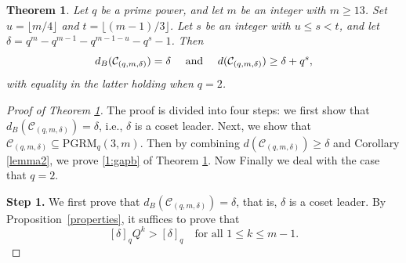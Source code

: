 \documentclass[10pt,a4paper]{amsart}
\newtheorem{theorem}{Theorem}
\begin{document}
\begin{theorem}\label{mainth}
Let $q$ be a prime power, and let  $m$ be an integer with $m\ge 13$.  Set $u=\lfloor m/4\rfloor$ and
$t=\lfloor (m-1)/3\rfloor$. Let $s$ be an integer with $u\le s<t$, and let
$\delta=q^m-q^{m-1}-q^{m-1-u}-q^{s}-1$. Then
\begin{equation} \label{1:gapb}
d_B(\mathcal{C}_{(q,m,\delta)})=\delta\quad \hbox{ and }\quad 
  d(\mathcal{C}_{(q,m,\delta)}) \geq \delta+q^{s}, 
\end{equation}
with equality in the latter holding when $q = 2$.
\end{theorem} 

\begin{proof}[Proof of Theorem \ref{mainth}]
The proof is divided into four steps: we first show that $d_B(\mathcal{C}_{(q,m,\delta)})=\delta$, i.e., $\delta$ is a coset leader. Next, we show that $\mathcal{C}_{(q,m,\delta)} \subseteq
\mathrm{PGRM}_q(3,m)$. Then by combining $d(\mathcal{C}_{(q,m,\delta)}) \ge \delta$ and Corollary \ref{lemma2}, we prove \eqref{1:gapb} of Theorem \ref{mainth}. Now Finally we deal with the case that $q=2$. 

{\bf Step 1.} We first prove that $d_B(\mathcal{C}_{(q,m,\delta)})=\delta$, that is, $\delta$ is a coset leader.  
By Proposition~\ref{properties}, it suffices to prove that
\begin{equation}\label{suf}
[\delta]_qQ^k>[\delta]_q
\quad\text{for all }1\leq k\leq m-1.
\end{equation}


\end{proof}
\end{document}
